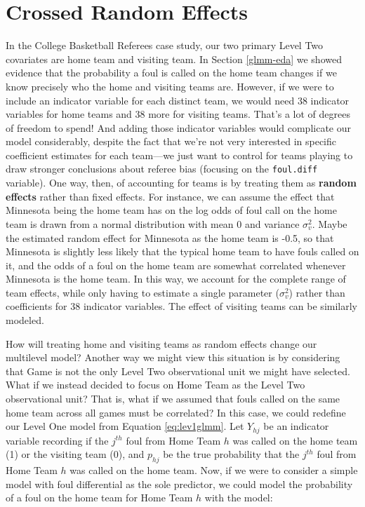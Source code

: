 \documentclass[
]{krantz}
\begin{document}
\hypertarget{crossedre}{%
\section{Crossed Random Effects}\label{crossedre}}

In the College Basketball Referees case study, our two primary Level Two covariates are home team and visiting team. In Section \ref{glmm-eda} we showed evidence that the probability a foul is called on the home team changes if we know precisely who the home and visiting teams are. However, if we were to include an indicator variable for each distinct team, we would need 38 indicator variables for home teams and 38 more for visiting teams. That's a lot of degrees of freedom to spend! And adding those indicator variables would complicate our model considerably, despite the fact that we're not very interested in specific coefficient estimates for each team---we just want to control for teams playing to draw stronger conclusions about referee bias (focusing on the \texttt{foul.diff} variable). One way, then, of accounting for teams is by treating them as \textbf{random effects} rather than fixed effects. For instance, we can assume the effect that Minnesota being the home team has on the log odds of foul call on the home team is drawn from a normal distribution with mean 0 and variance \(\sigma^{2}_{v}\). Maybe the estimated random effect for Minnesota as the home team is -0.5, so that Minnesota is slightly less likely that the typical home team to have fouls called on it, and the odds of a foul on the home team are somewhat correlated whenever Minnesota is the home team. In this way, we account for the complete range of team effects, while only having to estimate a single parameter (\(\sigma^{2}_{v}\)) rather than coefficients for 38 indicator variables. The effect of visiting teams can be similarly modeled.

How will treating home and visiting teams as random effects change our multilevel model? Another way we might view this situation is by considering that Game is not the only Level Two observational unit we might have selected. What if we instead decided to focus on Home Team as the Level Two observational unit? That is, what if we assumed that fouls called on the same home team across all games must be correlated? In this case, we could redefine our Level One model from Equation \eqref{eq:lev1glmm}. Let \(Y_{hj}\) be an indicator variable recording if the \(j^{th}\) foul from Home Team \(h\) was called on the home team (1) or the visiting team (0), and \(p_{hj}\) be the true probability that the \(j^{th}\) foul from Home Team \(h\) was called on the home team. Now, if we were to consider a simple model with foul differential as the sole predictor, we could model the probability of a foul on the home team for Home Team \(h\) with the model:
\end{document}
